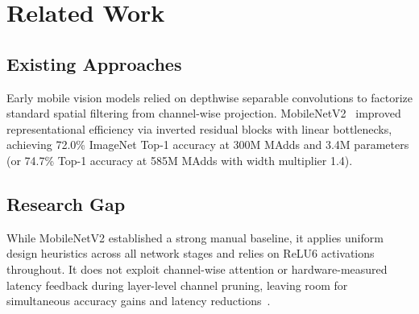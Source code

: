 \section{Related Work}\label{sec:related}
\subsection{Existing Approaches}
Early mobile vision models relied on depthwise separable convolutions to factorize standard spatial filtering from channel-wise projection.
MobileNetV2~\cite{sandler2018mobilenetv2} improved representational efficiency via inverted residual blocks with linear bottlenecks, achieving 72.0\% ImageNet Top-1 accuracy at 300M MAdds and 3.4M parameters (or 74.7\% Top-1 accuracy at 585M MAdds with width multiplier 1.4).

\subsection{Research Gap}
While MobileNetV2 established a strong manual baseline, it applies uniform design heuristics across all network stages and relies on ReLU6 activations throughout.
It does not exploit channel-wise attention or hardware-measured latency feedback during layer-level channel pruning, leaving room for simultaneous accuracy gains and latency reductions~\cite{howard2019mobilenetv3}.
